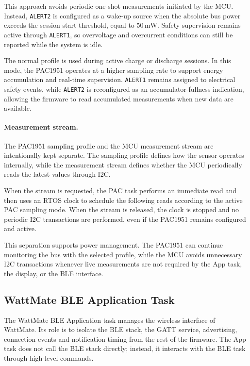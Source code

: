 This approach avoids periodic one-shot measurements initiated by the MCU. Instead, \texttt{ALERT2} is configured as a wake-up source when the absolute bus power exceeds the session start threshold, equal to \(50\,\mathrm{mW}\). Safety supervision remains active through \texttt{ALERT1}, so overvoltage and overcurrent conditions can still be reported while the system is idle.

The normal profile is used during active charge or discharge sessions. In this mode, the PAC1951 operates at a higher sampling rate to support energy accumulation and real-time supervision. \texttt{ALERT1} remains assigned to electrical safety events, while \texttt{ALERT2} is reconfigured as an accumulator-fullness indication, allowing the firmware to read accumulated measurements when new data are available.

\paragraph{Measurement stream.}
The PAC1951 sampling profile and the MCU measurement stream are intentionally kept separate. The sampling profile defines how the sensor operates internally, while the measurement stream defines whether the MCU periodically reads the latest values through I2C.

When the stream is requested, the PAC task performs an immediate read and then uses an RTOS clock to schedule the following reads according to the active PAC sampling mode. When the stream is released, the clock is stopped and no periodic I2C transactions are performed, even if the PAC1951 remains configured and active.

This separation supports power management. The PAC1951 can continue monitoring the bus with the selected profile, while the MCU avoids unnecessary I2C transactions whenever live measurements are not required by the App task, the display, or the BLE interface.


\subsection{WattMate BLE Application Task}

The WattMate BLE Application task manages the wireless interface of WattMate. Its role is to isolate the BLE stack, the GATT service, advertising, connection events and notification timing from the rest of the firmware. The App task does not call the BLE stack directly; instead, it interacts with the BLE task through high-level commands.


